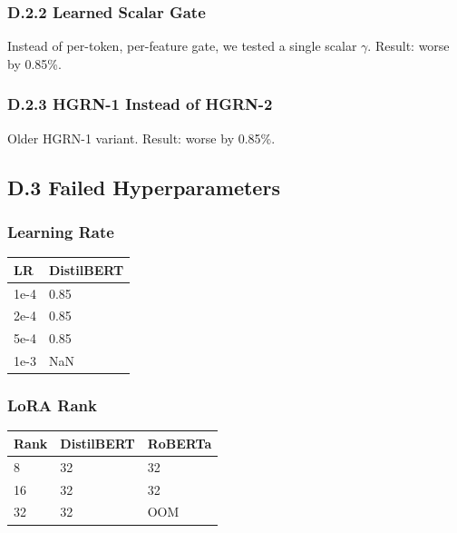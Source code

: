 \subsubsection{D.2.2 Learned Scalar Gate}

Instead of per-token, per-feature gate, we tested a single scalar $\gamma$. Result: 
worse by 0.85\%.

\subsubsection{D.2.3 HGRN-1 Instead of HGRN-2}

Older HGRN-1 variant. Result: worse by 0.85\%.

\subsection{D.3 Failed Hyperparameters}

\subsubsection{Learning Rate}

\begin{table}[H]
\centering
\small
\begin{tabular}{ll}
\toprule
\textbf{LR} & \textbf{DistilBERT} \\
\midrule
1e-4 & 0.85 \\
2e-4 & 0.85 \\
5e-4 & 0.85 \\
1e-3 & NaN \\
\bottomrule
\end{tabular}
\end{table}

\subsubsection{LoRA Rank}

\begin{table}[H]
\centering
\small
\begin{tabular}{lll}
\toprule
\textbf{Rank} & \textbf{DistilBERT} & \textbf{RoBERTa} \\
\midrule
8 & 32 & 32 \\
16 & 32 & 32 \\
32 & 32 & OOM \\
\bottomrule
\end{tabular}
\end{table}

